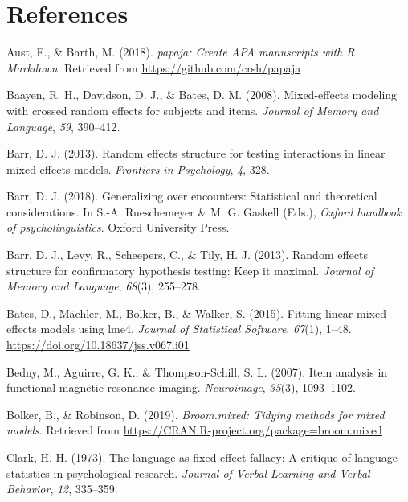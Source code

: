 \documentclass[
  english,
  doc,floatsintext]{apa6}
\begin{document}
\newpage

\hypertarget{references}{%
\section{References}\label{references}}

\begingroup
\setlength{\parindent}{-0.5in}
\setlength{\leftskip}{0.5in}

\hypertarget{refs}{}
\leavevmode\hypertarget{ref-R-papaja}{}%
Aust, F., \& Barth, M. (2018). \emph{papaja: Create APA manuscripts with R Markdown}. Retrieved from \url{https://github.com/crsh/papaja}

\leavevmode\hypertarget{ref-baayen_davidson_bates_2008}{}%
Baayen, R. H., Davidson, D. J., \& Bates, D. M. (2008). Mixed-effects modeling with crossed random effects for subjects and items. \emph{Journal of Memory and Language}, \emph{59}, 390--412.

\leavevmode\hypertarget{ref-barr_2013}{}%
Barr, D. J. (2013). Random effects structure for testing interactions in linear mixed-effects models. \emph{Frontiers in Psychology}, \emph{4}, 328.

\leavevmode\hypertarget{ref-barr_2018}{}%
Barr, D. J. (2018). Generalizing over encounters: Statistical and theoretical considerations. In S.-A. Rueschemeyer \& M. G. Gaskell (Eds.), \emph{Oxford handbook of psycholinguistics}. Oxford University Press.

\leavevmode\hypertarget{ref-barr_et_al_2013}{}%
Barr, D. J., Levy, R., Scheepers, C., \& Tily, H. J. (2013). Random effects structure for confirmatory hypothesis testing: Keep it maximal. \emph{Journal of Memory and Language}, \emph{68}(3), 255--278.

\leavevmode\hypertarget{ref-R-lme4}{}%
Bates, D., Mächler, M., Bolker, B., \& Walker, S. (2015). Fitting linear mixed-effects models using lme4. \emph{Journal of Statistical Software}, \emph{67}(1), 1--48. \url{https://doi.org/10.18637/jss.v067.i01}

\leavevmode\hypertarget{ref-bedny_aguirre_thompson-schill_2007}{}%
Bedny, M., Aguirre, G. K., \& Thompson-Schill, S. L. (2007). Item analysis in functional magnetic resonance imaging. \emph{Neuroimage}, \emph{35}(3), 1093--1102.

\leavevmode\hypertarget{ref-R-broom.mixed}{}%
Bolker, B., \& Robinson, D. (2019). \emph{Broom.mixed: Tidying methods for mixed models}. Retrieved from \url{https://CRAN.R-project.org/package=broom.mixed}

\leavevmode\hypertarget{ref-clark_1973}{}%
Clark, H. H. (1973). The language-as-fixed-effect fallacy: A critique of language statistics in psychological research. \emph{Journal of Verbal Learning and Verbal Behavior}, \emph{12}, 335--359.
\end{document}
